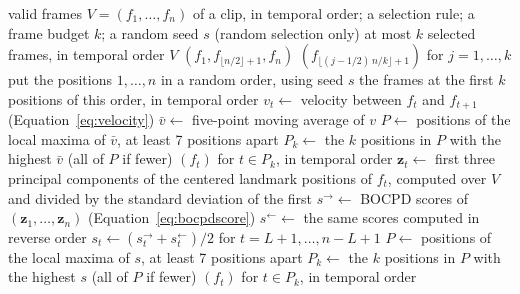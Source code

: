 \begin{algorithm}[t]
   \caption{Frame selection}
   \label{alg:selection}
   \begin{algorithmic}[1]
      \Require valid frames $V = (f_1, \dots, f_n)$ of a clip, in temporal order; a selection rule; a frame budget $k$; a random seed $s$ (random selection only)
      \Ensure at most $k$ selected frames, in temporal order
         \State \Return $V$
      \EndIf
       
         \State \Return $(f_1, f_{\lfloor n/2 \rfloor + 1}, f_n)$
       
         \State \Return $(f_{\lfloor (j - 1/2)\,n/k \rfloor + 1})$ for $j = 1, \dots, k$
       
         \State put the positions $1, \dots, n$ in a random order, using seed $s$
         \State \Return the frames at the first $k$ positions of this order, in temporal order
            \State $v_t \gets$ velocity between $f_t$ and $f_{t+1}$ (Equation~\ref{eq:velocity})
         \EndFor
         \State $\bar{v} \gets$ five-point moving average of $v$
         \State $P \gets$ positions of the local maxima of $\bar{v}$, at least 7 positions apart
         \State $P_k \gets$ the $k$ positions in $P$ with the highest $\bar{v}$ (all of $P$ if fewer)
         \State \Return $(f_t)$ for $t \in P_k$, in temporal order
      \Else {}
         \State $\mathbf{z}_t \gets$ first three principal components of the centered landmark positions of $f_t$, computed over $V$ and divided by the standard deviation of the first
         \State $s^{\rightarrow} \gets$ BOCPD scores of $(\mathbf{z}_1, \dots, \mathbf{z}_n)$ (Equation~\ref{eq:bocpdscore})
         \State $s^{\leftarrow} \gets$ the same scores computed in reverse order
         \State $s_t \gets (s^{\rightarrow}_t + s^{\leftarrow}_t)/2$ for $t = L + 1, \dots, n - L + 1$
         \State $P \gets$ positions of the local maxima of $s$, at least 7 positions apart
         \State $P_k \gets$ the $k$ positions in $P$ with the highest $s$ (all of $P$ if fewer)
         \State \Return $(f_t)$ for $t \in P_k$, in temporal order
      \EndIf
   \end{algorithmic}
\end{algorithm}

